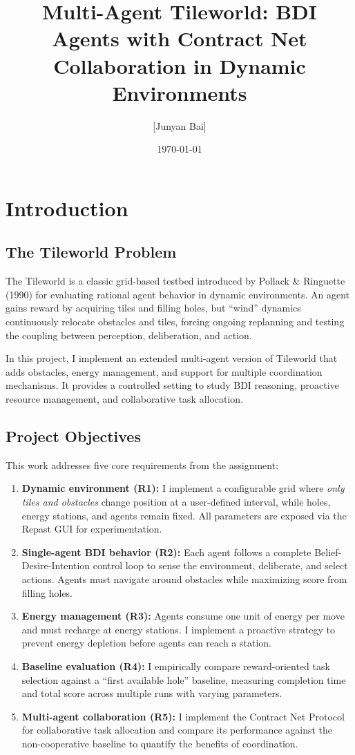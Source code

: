 \documentclass[titlepage=formal,code=listings,logo=../../assets/火炬+英文校名-左右.pdf]{../../SUSTechHomework}
\title{Multi-Agent Tileworld: BDI Agents with Contract Net Collaboration in Dynamic Environments}
\author{[Junyan Bai]}
\date{\today}
\begin{document}
\maketitle
\tableofcontents
\newpage

\section{Introduction}

\subsection{The Tileworld Problem}

The Tileworld is a classic grid-based testbed introduced by Pollack \& Ringuette (1990) for evaluating rational agent behavior in dynamic environments. An agent gains reward by acquiring tiles and filling holes, but ``wind'' dynamics continuously relocate obstacles and tiles, forcing ongoing replanning and testing the coupling between perception, deliberation, and action.

In this project, I implement an extended multi-agent version of Tileworld that adds obstacles, energy management, and support for multiple coordination mechanisms. It provides a controlled setting to study BDI reasoning, proactive resource management, and collaborative task allocation.

\subsection{Project Objectives}

This work addresses five core requirements from the assignment:

\begin{enumerate}
  \item \textbf{Dynamic environment (R1):} I implement a configurable grid where \emph{only tiles and obstacles} change position at a user-defined interval, while holes, energy stations, and agents remain fixed. All parameters are exposed via the Repast GUI for experimentation.
  \item \textbf{Single-agent BDI behavior (R2):} Each agent follows a complete Belief-Desire-Intention control loop to sense the environment, deliberate, and select actions. Agents must navigate around obstacles while maximizing score from filling holes.
  \item \textbf{Energy management (R3):} Agents consume one unit of energy per move and must recharge at energy stations. I implement a proactive strategy to prevent energy depletion before agents can reach a station.
  \item \textbf{Baseline evaluation (R4):} I empirically compare reward-oriented task selection against a ``first available hole'' baseline, measuring completion time and total score across multiple runs with varying parameters.
  \item \textbf{Multi-agent collaboration (R5):} I implement the Contract Net Protocol for collaborative task allocation and compare its performance against the non-cooperative baseline to quantify the benefits of coordination.
\end{enumerate}
\end{document}
